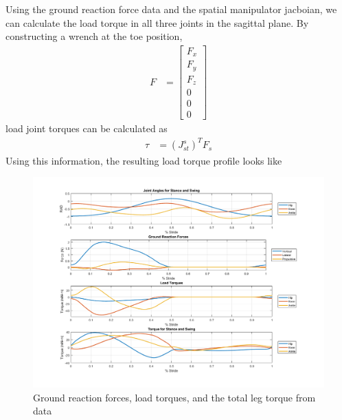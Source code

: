 \documentclass[runningheads,a4paper]{llncs}
\begin{document}
	Using the ground reaction force data and the spatial manipulator jacboian, we can calculate the load torque in all three joints in the sagittal plane. By constructing a wrench at the toe position,
		\begin{align*}
			F &= 
				\begin{bmatrix}
					F_{x} \\
					F_{y} \\
					F_{z} \\
					0 \\
					0 \\
					0
				\end{bmatrix}
		\end{align*}
	load joint torques can be calculated as
	\begin{align*}
		\tau &= (J^{s}_{st})^{T}F_{s}
	\end{align*}
	Using this information, the resulting load torque profile looks like
		\begin{figure}
			\centering
			\includegraphics[width=\textwidth]{loadt1.png}
			\caption{Ground reaction forces, load torques, and the total leg torque from data}
			\label{fig:loadt1}
		\end{figure}
	
\end{document}
